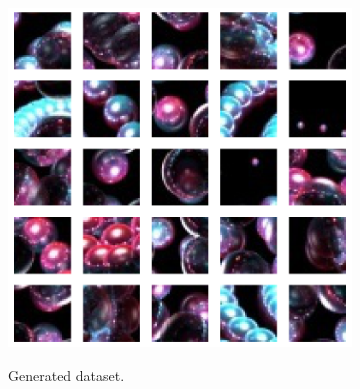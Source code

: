 \documentclass[letterpaper]{article} %
\begin{document}
\begin{figure}[h!]
\centering
\begin{subfigure}{0.22\textwidth}
\begin{center}
\begin{minipage}[t]{0.95\linewidth}
\begin{centering}
{\includegraphics[width=\linewidth]{frame_samples.png}}
\caption{Generated dataset.}
\label{fig:frame_dataset}
\end{centering}
\end{minipage}
\end{center}
\end{subfigure}
\begin{subfigure}{0.22\textwidth}
\begin{center}
\begin{minipage}[t]{0.95\linewidth}
\begin{centering}

\end{centering}
\end{minipage}
\end{center}
\end{subfigure}
\end{figure}
\end{document}
